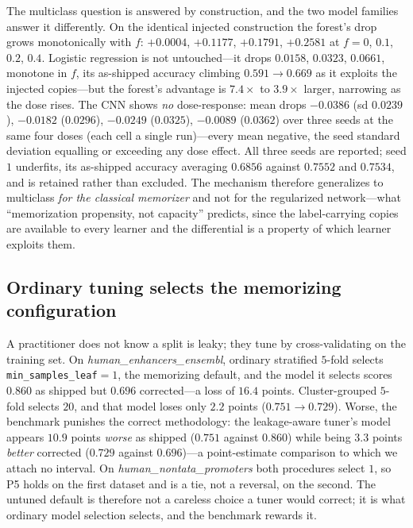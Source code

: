 \documentclass[webpdf,modern,large,namedate]{oup-authoring-template}%
\begin{document}
The multiclass question is answered by construction, and the two model families answer it differently. On the identical injected construction the forest's drop grows monotonically with $f$: $+0.0004$, $+0.1177$, $+0.1791$, $+0.2581$ at $f=0$, $0.1$, $0.2$, $0.4$. Logistic regression is not untouched---it drops $0.0158$, $0.0323$, $0.0661$, monotone in $f$, its as-shipped accuracy climbing $0.591\to0.669$ as it exploits the injected copies---but the forest's advantage is $7.4\times$ to $3.9\times$ larger, narrowing as the dose rises. The CNN shows \emph{no} dose-response: mean drops $-0.0386$ (sd $0.0239$), $-0.0182$ ($0.0296$), $-0.0249$ ($0.0325$), $-0.0089$ ($0.0362$) over three seeds at the same four doses (each cell a single run)---every mean negative, the seed standard deviation equalling or exceeding any dose effect. All three seeds are reported; seed $1$ underfits, its as-shipped accuracy averaging $0.6856$ against $0.7552$ and $0.7534$, and is retained rather than excluded. The mechanism therefore generalizes to multiclass \emph{for the classical memorizer} and not for the regularized network---what ``memorization propensity, not capacity'' predicts, since the label-carrying copies are available to every learner and the differential is a property of which learner exploits them.

\subsection{Ordinary tuning selects the memorizing configuration}\label{sec:r-tuning}
A practitioner does not know a split is leaky; they tune by cross-validating on the training set. On \textit{human\_enhancers\_ensembl}, ordinary stratified $5$-fold selects \texttt{min\_samples\_leaf}$=1$, the memorizing default, and the model it selects scores $0.860$ as shipped but $0.696$ corrected---a loss of $16.4$ points. Cluster-grouped $5$-fold selects $20$, and that model loses only $2.2$ points ($0.751\to0.729$). Worse, the benchmark punishes the correct methodology: the leakage-aware tuner's model appears $10.9$ points \emph{worse} as shipped ($0.751$ against $0.860$) while being $3.3$ points \emph{better} corrected ($0.729$ against $0.696$)---a point-estimate comparison to which we attach no interval. On \textit{human\_nontata\_promoters} both procedures select $1$, so P5 holds on the first dataset and is a tie, not a reversal, on the second. The untuned default is therefore not a careless choice a tuner would correct; it is what ordinary model selection selects, and the benchmark rewards it.
\end{document}
